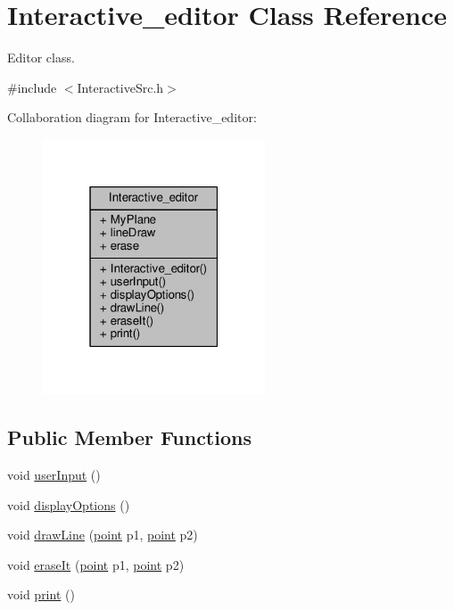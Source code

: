 \hypertarget{classInteractive__editor}{}\section{Interactive\+\_\+editor Class Reference}
\label{classInteractive__editor}


Editor class.  




{\ttfamily \#include $<$Interactive\+Src.\+h$>$}



Collaboration diagram for Interactive\+\_\+editor\+:\nopagebreak
\begin{figure}[H]
\begin{center}
\leavevmode
\includegraphics[width=187pt]{classInteractive__editor__coll__graph}
\end{center}
\end{figure}
\subsection*{Public Member Functions}
\begin{DoxyCompactItemize}
\item 
void \hyperlink{classInteractive__editor_aa7d472e169eed213d1fcb874c6f5a6cd}{user\+Input} ()
\item 
void \hyperlink{classInteractive__editor_a8078ec1404bdd80e09320d14d198f628}{display\+Options} ()
\item 
void \hyperlink{classInteractive__editor_a5a7723f6affebd15ae935eb48e91359f}{draw\+Line} (\hyperlink{structpoint}{point} p1, \hyperlink{structpoint}{point} p2)
\item 
void \hyperlink{classInteractive__editor_a678c382483cb0b40d1616c1d28eaf200}{erase\+It} (\hyperlink{structpoint}{point} p1, \hyperlink{structpoint}{point} p2)
\item 
void \hyperlink{classInteractive__editor_aedd168ce9dc711e3756aafa44146cb76}{print} ()
\end{DoxyCompactItemize}
